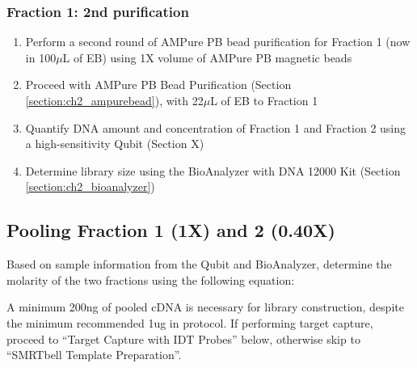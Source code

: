 \subsubsection{Fraction 1: 2nd purification}
\begin{enumerate}
	\item Perform a second round of AMPure PB bead purification for Fraction 1 (now in 100$\mu$L of EB) using 1X volume of AMPure PB magnetic beads
	\item Proceed with AMPure PB Bead Purification (Section \ref{section:ch2_ampurebead}), with 22$\mu$L of EB to Fraction 1
	\item Quantify DNA amount and concentration of Fraction 1 and Fraction 2 using a high-sensitivity Qubit (Section X) 
	\item Determine library size using the BioAnalyzer with DNA 12000 Kit (Section \ref{section:ch2_bioanalyzer}) 
\end{enumerate}

\subsection{Pooling Fraction 1 (1X) and 2 (0.40X)}
Based on sample information from the Qubit and BioAnalyzer, determine the molarity of the two fractions using the following equation: 

A minimum 200ng of pooled cDNA is necessary for library construction, despite the minimum recommended 1ug in protocol. If performing target capture, proceed to “Target Capture with IDT Probes” below, otherwise skip to “SMRTbell Template Preparation”. 


